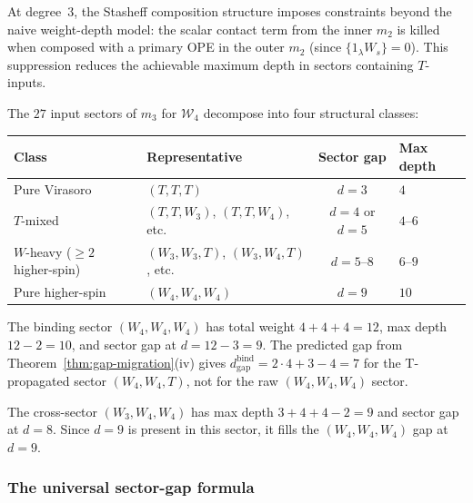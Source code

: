 At degree~$3$, the Stasheff composition structure imposes
constraints beyond the naive weight-depth model: the scalar
contact term from the inner $m_2$ is killed when composed
with a primary OPE in the outer $m_2$
(since $\{1_\lambda W_s\} = 0$). This suppression
reduces the achievable maximum depth in sectors containing
$T$-inputs.

\begin{computation}
\label{comp:w4-depth-degree-3}
%
The $27$ input sectors of $m_3$ for $\mathcal{W}_4$
decompose into four structural classes:

\begin{center}
\small
\renewcommand{\arraystretch}{1.3}
\begin{tabular}{llcl}
\toprule
\textbf{Class} & \textbf{Representative}
 & \textbf{Sector gap} & \textbf{Max depth} \\
\midrule
Pure Virasoro & $(T,T,T)$
 & $d = 3$ & $4$ \\
$T$-mixed & $(T,T,W_3)$, $(T,T,W_4)$, etc.
 & $d = 4$ or $d = 5$ & $4$--$6$ \\
$W$-heavy ($\ge 2$ higher-spin)
 & $(W_3,W_3,T)$, $(W_3,W_4,T)$, etc.
 & $d = 5$--$8$ & $6$--$9$ \\
Pure higher-spin
 & $(W_4,W_4,W_4)$
 & $d = 9$ & $10$ \\
\bottomrule
\end{tabular}
\end{center}

\noindent
The binding sector $(W_4, W_4, W_4)$ has total weight
$4 + 4 + 4 = 12$, max depth $12 - 2 = 10$, and sector gap
at $d = 12 - 3 = 9$. The predicted gap from
Theorem~\textup{\ref{thm:gap-migration}(iv)} gives
\(d_{\mathrm{gap}}^{\mathrm{bind}}=2\cdot4+3-4=7\) for the
T-propagated sector \((W_4,W_4,T)\), not for the raw
\((W_4,W_4,W_4)\) sector.

The cross-sector $(W_3, W_4, W_4)$ has max depth
$3 + 4 + 4 - 2 = 9$ and sector gap at $d = 8$. Since
$d = 9$ is present in this sector, it fills the
$(W_4, W_4, W_4)$ gap at $d = 9$.
\end{computation}

\subsubsection{The universal sector-gap formula}

